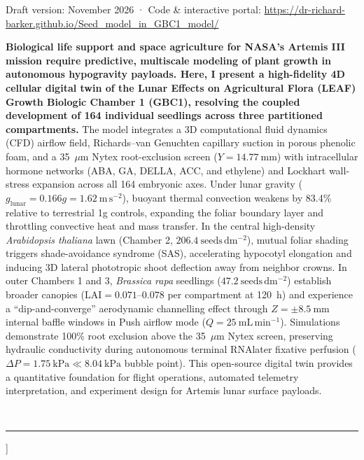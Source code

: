 \documentclass[10pt,twocolumn,twoside]{article}
\begin{document}
{\begin{flushleft}
    \noindent
    {\fontsize{8bp}{10bp}\selectfont\sffamily\color{npjgray} Draft version: November 2026 · Code \& interactive portal: \url{https://dr-richard-barker.github.io/Seed_model_in_GBC1_model/}}\\[10pt]

    \noindent
    \parbox{\textwidth}{
      \fontsize{9bp}{12bp}\selectfont
      \textbf{Biological life support and space agriculture for NASA's Artemis III mission require predictive, multiscale modeling of plant growth in autonomous hypogravity payloads. Here, I present a high-fidelity 4D cellular digital twin of the Lunar Effects on Agricultural Flora (LEAF) Growth Biologic Chamber 1 (GBC1), resolving the coupled development of 164 individual seedlings across three partitioned compartments.} The model integrates a 3D computational fluid dynamics (CFD) airflow field, Richards--van Genuchten capillary suction in porous phenolic foam, and a 35~$\mu$m Nytex root-exclusion screen ($Y = 14.77\ \mathrm{mm}$) with intracellular hormone networks (ABA, GA, DELLA, ACC, and ethylene) and Lockhart wall-stress expansion across all 164 embryonic axes. Under lunar gravity ($g_{\mathrm{lunar}} = 0.166g = 1.62\ \mathrm{m\,s^{-2}}$), buoyant thermal convection weakens by 83.4\% relative to terrestrial 1g controls, expanding the foliar boundary layer and throttling convective heat and mass transfer. In the central high-density \textit{Arabidopsis thaliana} lawn (Chamber 2, $206.4\ \mathrm{seeds\,dm^{-2}}$), mutual foliar shading triggers shade-avoidance syndrome (SAS), accelerating hypocotyl elongation and inducing 3D lateral phototropic shoot deflection away from neighbor crowns. In outer Chambers 1 and 3, \textit{Brassica rapa} seedlings ($47.2\ \mathrm{seeds\,dm^{-2}}$) establish broader canopies ($\mathrm{LAI} = 0.071\text{--}0.078$ per compartment at 120~h) and experience a ``dip-and-converge'' aerodynamic channelling effect through $Z = \pm 8.5\ \mathrm{mm}$ internal baffle windows in Push airflow mode ($Q = 25\ \mathrm{mL\,min^{-1}}$). Simulations demonstrate 100\% root exclusion above the 35~$\mu$m Nytex screen, preserving hydraulic conductivity during autonomous terminal RNAlater fixative perfusion ($\Delta P = 1.75\ \mathrm{kPa} \ll 8.04\ \mathrm{kPa}$ bubble point). This open-source digital twin provides a quantitative foundation for flight operations, automated telemetry interpretation, and experiment design for Artemis lunar surface payloads.
    }\\[8pt]

    \noindent\rule{\textwidth}{0.4pt}\vspace{6pt}
  \end{flushleft}
}]
\end{document}
